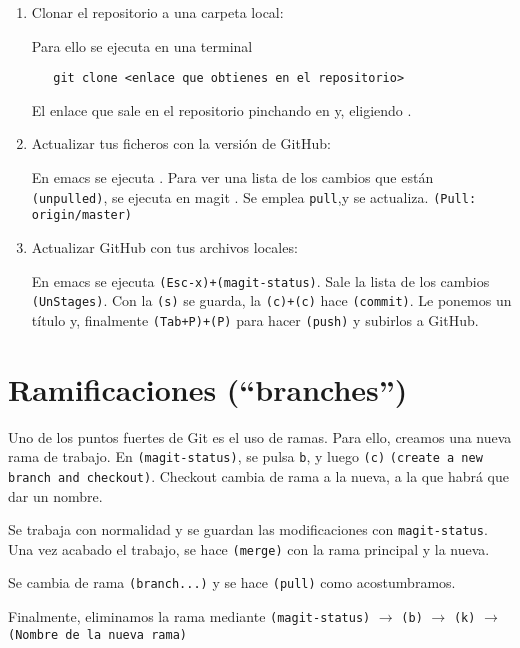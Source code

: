 \begin{enumerate}
\item Clonar el repositorio a una carpeta local:

  Para ello se ejecuta en una terminal
\begin{verbatim}
   git clone <enlace que obtienes en el repositorio>
\end{verbatim}
  El enlace que sale en el repositorio pinchando en  y, eligiendo .

\item Actualizar tus ficheros con la versión de GitHub:

  En emacs se ejecuta . Para ver una
  lista de los cambios que están \texttt{(unpulled)}, se ejecuta en
  magit . Se emplea \texttt{pull},y se actualiza.
  \texttt{(Pull: origin/master)}
\item Actualizar GitHub con tus archivos locales:

  En emacs se ejecuta \texttt{(Esc-x)+(magit-status)}. Sale la lista
  de los cambios \texttt{(UnStages)}. Con la \texttt{(s)} se guarda,
  la \texttt{(c)+(c)} hace \texttt{(commit)}. Le ponemos un título y,
  finalmente \texttt{(Tab+P)+(P)} para hacer \texttt{(push)} y subirlos
  a GitHub.
\end{enumerate}

\section{Ramificaciones (``branches'')}

Uno de los puntos fuertes de Git es el uso de ramas. Para ello,
creamos una nueva rama de trabajo. En \texttt{(magit-status)}, se pulsa
\texttt{b}, y luego \texttt{(c)} \texttt{(create a new branch and checkout)}.
Checkout cambia de rama a la nueva, a la que habrá que dar un nombre.

Se trabaja con normalidad y se guardan las modificaciones con
\texttt{magit-status}. Una vez acabado el trabajo, se hace \texttt{(merge)}
con la rama principal y la nueva.

Se cambia de rama \texttt{(branch...)} y se hace \texttt{(pull)}
como acostumbramos.

Finalmente, eliminamos la rama mediante \texttt{(magit-status)}
$\rightarrow $ \texttt{(b)} $\rightarrow$ \texttt{(k)}
$\rightarrow $ \texttt{(Nombre de la nueva rama)}

